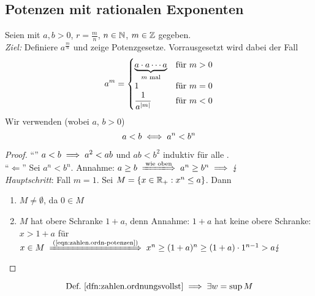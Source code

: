\documentclass[12pt]{scrreprt}
\begin{document}
\subsection*{Potenzen mit rationalen Exponenten}
Seien  mit $a, b > 0$, $r=\frac{m}{n}$, $n\in\mathbb{N}$, $m\in\mathbb{Z}$ gegeben.\\
\emph{Ziel:} Definiere $a^\frac{m}{n}$ und zeige Potenzgesetze. Vorrausgesetzt wird dabei der Fall
\[a^m =
\begin{cases}
\underbrace{a \cdot a \dotsm a}_{m\text{ mal}} &\text{für }m>0\\
1 &\text{für }m=0\\
\displaystyle\frac{1}{a^{\left\lvert m\right\lvert}} &\text{für }m<0
\end{cases}\]
Wir verwenden (wobei $a$, $b > 0$)
\begin{equation} 
a<b \iff a^n <  b^n 
\label{eqn:zahlen.ordn-potenzen}
\end{equation}
\begin{proof}
"`\folgt"' $a<b \implies a^2 < ab$ und $ab < b^2$ induktiv für alle .\\
"`$\Longleftarrow$"' Sei $a^n < b^n$. Annahme: $a \ge b \folgtwegen{\text{wie oben}} a^n \ge b^n \folgt \blitz$\\
\emph{Hauptschritt}: Fall $m=1$. Sei $M = \{ x \in \mathbb{R}_+ : x^n \le a \}$. Dann
\begin{enumerate}
\item $M \ne \emptyset$, da $0 \in M$
\item $M$ hat obere Schranke $1+a$, denn Annahme: $1+a$ hat keine 
obere Schranke: $x>1+a$ für $x \in M \folgtnach{(\ref{eqn:zahlen.ordn-potenzen})} 
x^n \ge (1+a)^n\ge (1+a)\cdot 1^{n-1} > a \blitz$
\end{enumerate}
\end{proof}

\begin{equation}
\text{Def.~\ref{dfn:zahlen.ordnungsvollst}} \implies \exists w = \sup M
\label{eqn:zahlen.exist-wurzel}
\end{equation}
\end{document}
